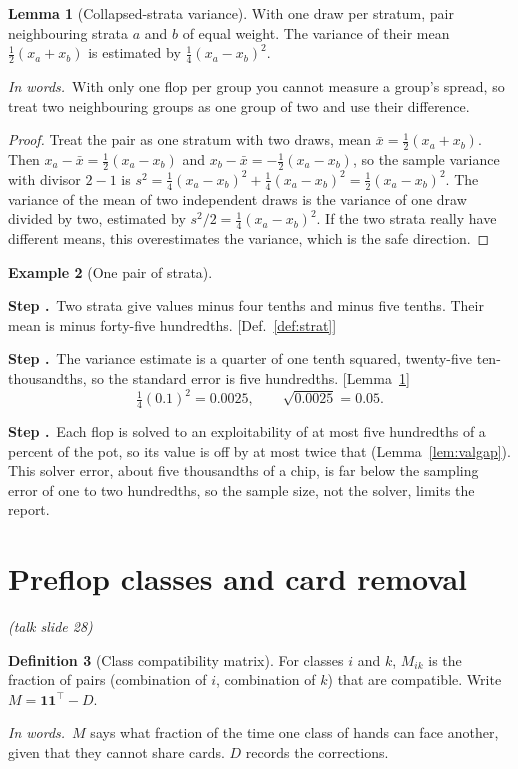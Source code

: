 \documentclass[11pt]{article}
\newcommand{\one}{\mathbf 1}
\theoremstyle{definition}
\newtheorem{definition}{Definition}[section]
\newtheorem{example}[definition]{Example}
\newtheorem{lemma}[definition]{Lemma}
\newcommand{\inwords}{\par\smallskip\noindent\textit{In words.}\ }
\newcounter{stp}
\newcommand{\steps}{\setcounter{stp}{0}}
\newcommand{\st}{\stepcounter{stp}\par\medskip\noindent\textbf{Step \arabic{stp}.}\ }
\newcommand{\by}[1]{\hfill{\small\color{blue!50!black}[#1]}}
\newcommand{\Def}[1]{Def.~\ref{#1}}\newcommand{\Lem}[1]{Lemma~\ref{#1}}\newcommand{\Thm}[1]{Thm.~\ref{#1}}
\newcommand{\slide}[1]{\hfill{\small\itshape (talk slide #1)}}
\begin{document}
\begin{lemma}[Collapsed-strata variance]\label{lem:collapse}
With one draw per stratum, pair neighbouring strata $a$ and $b$ of equal weight. The variance of their mean $\tfrac12(x_a+x_b)$ is
estimated by $\tfrac14(x_a-x_b)^2$.
\inwords With only one flop per group you cannot measure a group's spread, so treat two neighbouring groups as one group
of two and use their difference.
\end{lemma}
\begin{proof}
Treat the pair as one stratum with two draws, mean $\bar x=\tfrac12(x_a+x_b)$. Then $x_a-\bar x=\tfrac12(x_a-x_b)$ and
$x_b-\bar x=-\tfrac12(x_a-x_b)$, so the sample variance with divisor $2-1$ is $s^2=\tfrac14(x_a-x_b)^2+\tfrac14(x_a-x_b)^2=\tfrac12(x_a-x_b)^2$.
The variance of the mean of two independent draws is the variance of one draw divided by two, estimated by
$s^2/2=\tfrac14(x_a-x_b)^2$. If the two strata really have different means, this overestimates the variance, which is the
safe direction.
\end{proof}

\begin{example}[One pair of strata]\label{ex:collapse}
\steps
\st Two strata give values minus four tenths and minus five tenths. Their mean is minus forty-five hundredths.
\by{\Def{def:strat}}
\st The variance estimate is a quarter of one tenth squared, twenty-five ten-thousandths, so the standard error is five
hundredths. \by{\Lem{lem:collapse}}
\[ \tfrac14(0.1)^2=0.0025,\qquad\sqrt{0.0025}=0.05. \]
\st Each flop is solved to an exploitability of at most five hundredths of a percent of the pot, so its value is off by at
most twice that (\Lem{lem:valgap}). This solver error, about five thousandths of a chip, is far below the sampling error
of one to two hundredths, so the sample size, not the solver, limits the report.
\end{example}
\begin{center}\end{center}

\section{Preflop classes and card removal}\label{sec:preflop}\slide{28}
\begin{definition}[Class compatibility matrix]\label{def:M}
For classes $i$ and $k$, $M_{ik}$ is the fraction of pairs (combination of $i$, combination of $k$) that are compatible.
Write $M=\one\one^\top-D$.
\inwords $M$ says what fraction of the time one class of hands can face another, given that they cannot share cards.
$D$ records the corrections.
\end{definition}
\end{document}
